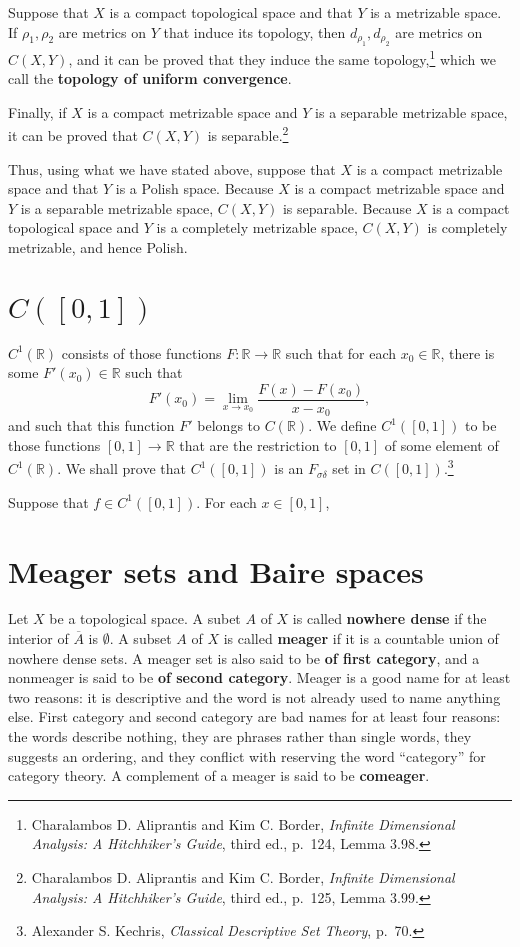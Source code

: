 \documentclass{article}
\theoremstyle{definition}
\begin{document}
Suppose that $X$ is a compact topological space and that $Y$ is a  metrizable space. 
If $\rho_1,\rho_2$ are metrics on $Y$ that induce its topology,
then $d_{\rho_1},d_{\rho_2}$ are metrics on $C(X,Y)$, and it can be proved
that they induce the same topology,\footnote{Charalambos D. 
Aliprantis and Kim C. Border, {\em Infinite Dimensional Analysis: A Hitchhiker's Guide}, third ed., p.~124,
Lemma 3.98.}  which we call the \textbf{topology of uniform convergence}. 


Finally, if $X$ is a compact metrizable space and $Y$ is a separable metrizable space, it can be proved that
$C(X,Y)$ is separable.\footnote{Charalambos D. 
Aliprantis and Kim C. Border, {\em Infinite Dimensional Analysis: A Hitchhiker's Guide}, third ed., p.~125,
Lemma 3.99.} 

Thus, using what we have stated above, suppose that $X$ is a compact metrizable space and that $Y$ is a Polish
space. Because $X$ is a compact metrizable space and $Y$ is a separable metrizable space, $C(X,Y)$
is separable. Because $X$ is a compact topological space and $Y$ is a completely metrizable space,
$C(X,Y)$ is completely metrizable, and hence Polish.


\section{$C([0,1])$}
$C^1(\mathbb{R})$ consists of those functions $F:\mathbb{R} \to \mathbb{R}$ such that for each $x_0 \in \mathbb{R}$, there is some 
$F'(x_0) \in \mathbb{R}$ such that
\[
F'(x_0)= \lim_{x \to x_0} \frac{F(x)-F(x_0)}{x-x_0},
\]
and such that this function $F'$ belongs to $C(\mathbb{R})$. We define $C^1([0,1])$ to be those functions $[0,1] \to \mathbb{R}$ that are the restriction
to $[0,1]$ of some element of $C^1(\mathbb{R})$. 
We shall prove that $C^1([0,1])$ is an $F_{\sigma \delta}$ set in $C([0,1])$.\footnote{Alexander S. Kechris, {\em Classical Descriptive Set Theory}, p.~70.}

Suppose that $f \in C^1([0,1])$. For each $x \in [0,1]$, 




\section{Meager sets and Baire spaces}
Let $X$ be a topological space.  A subet $A$ of $X$ is called \textbf{nowhere dense} if 
the interior of $\overline{A}$ is $\emptyset$. A subset $A$ of $X$ is called \textbf{meager} if it is a countable union of nowhere dense sets. A meager
set is also said to be \textbf{of first category}, and a nonmeager is said to be \textbf{of second category}.
Meager is a good name  for at least two reasons: it is descriptive and  the word is not already used to name anything else.
First category and second category are bad names for at least four reasons: the words describe nothing, they are phrases rather than single
words, they suggests an ordering, and they conflict with
reserving the word ``category'' for category theory. 
A complement of a meager  is said to be \textbf{comeager}. 
\end{document}
